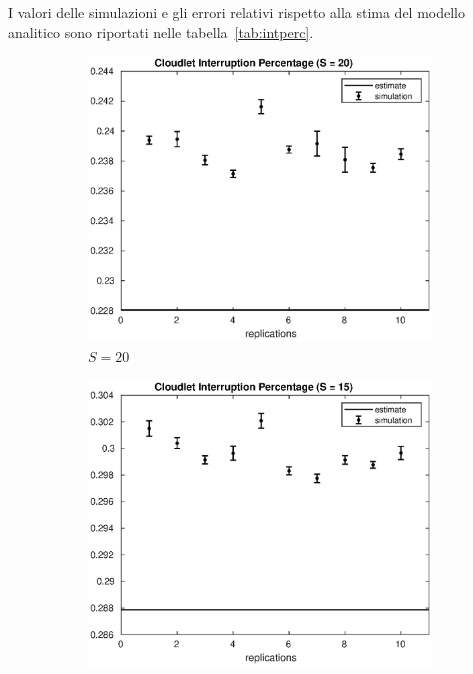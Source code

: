 I valori delle simulazioni e gli errori relativi rispetto alla stima del modello
analitico sono riportati nelle tabella~\ref{tab:intperc}.
%
\begin{figure}[!h]
\centering
%
\begin{subfigure}[t]{0.49\textwidth}
\includegraphics[width=\textwidth]{figures/simul/20_500K_intperc}
\caption{$S = 20$}
\label{20_intperc}
\end{subfigure}
%
\begin{subfigure}[t]{0.49\textwidth}
\includegraphics[width=\textwidth]{figures/simul/15_500K_intperc}

\end{subfigure}
\end{figure}
